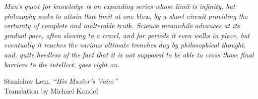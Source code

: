 \documentclass[11pt, a4paper, twoside]{Thesis} %
\begin{document}
\vfill

\textit{Man's quest for knowledge is an expanding series whose limit is infinity, but philosophy seeks to attain that limit at one blow, by a short circuit providing the certainty of complete and inalterable truth. Science meanwhile advances at its gradual pace, often slowing to a crawl, and for periods it even walks in place, but eventually it reaches the various ultimate trenches dug by philosophical thought, and, quite heedless of the fact that it is not supposed to be able to cross those final barriers to the intellect, goes right on.}
\begin{flushright}
  Stanis\l{}aw Lem, \textit{``His Master's Voice''}\\
  Translation by Michael Kandel
\end{flushright}
\par
\endgroup
\vfill

\cleardoublepage %



 \cleardoublepage
 
 
\cleardoublepage %

\pagestyle{fancy} %

\makeatletter
  \def\@pnumwidth{4em}
  \def\@tocrmarg {3.5em} %
\makeatother

\renewcommand{\chaptermark}[1]{%
\markboth{#1}{}}
\end{document}
